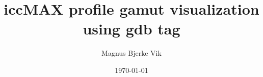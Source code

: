 \documentclass[titlepage, 11pt]{article}
\title{iccMAX profile gamut visualization using gdb tag}
\author{Magnus Bjerke Vik}
\date{\today}
\begin{document}
\maketitle

\tableofcontents
\clearpage

\begin{abstract}

\end{abstract}




\end{document}
